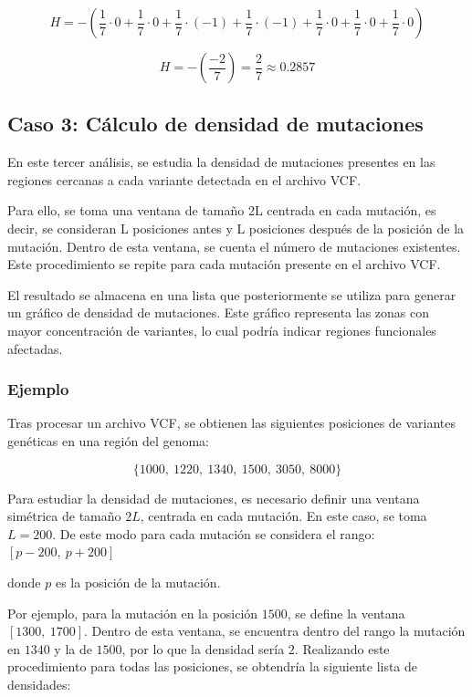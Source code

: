 \documentclass[11pt,spanish,listoffigures,listoftables]{tfgetsinf}
\begin{document}
\[
H = - \left(
\frac{1}{7} \cdot 0 +
\frac{1}{7} \cdot 0 +
\frac{1}{7} \cdot (-1) +
\frac{1}{7} \cdot (-1) +
\frac{1}{7} \cdot 0 +
\frac{1}{7} \cdot 0 +
\frac{1}{7} \cdot 0
\right)
\]

\[
H = - \left( \frac{-2}{7} \right) = \frac{2}{7} \approx 0.2857
\]


\subsection{Caso 3: Cálculo de densidad de mutaciones}

En este tercer análisis, se estudia la densidad de mutaciones presentes en las regiones cercanas a cada variante detectada en el archivo \acs{VCF}.

Para ello, se toma una ventana de tamaño 2L centrada en cada mutación, es decir, se consideran L posiciones antes y L posiciones después de la posición de la mutación. Dentro de esta ventana, se cuenta el número de mutaciones existentes. Este procedimiento se repite para cada mutación presente en el archivo \acs{VCF}.

El resultado se almacena en una lista que posteriormente se utiliza para generar un gráfico de densidad de mutaciones. Este gráfico representa las zonas con mayor concentración de variantes, lo cual podría indicar regiones funcionales afectadas.

\subsubsection{Ejemplo}

Tras procesar un archivo \acs{VCF}, se obtienen las siguientes posiciones de variantes genéticas en una región del genoma:

\[
\{1000,\ 1220,\ 1340,\ 1500,\ 3050,\ 8000\}
\]

Para estudiar la densidad de mutaciones, es necesario definir una ventana simétrica de tamaño $2L$, centrada en cada mutación. En este caso, se toma $L = 200$. De este modo para cada mutación se considera el rango: $[p - 200,\ p + 200]$

donde $p$ es la posición de la mutación.

Por ejemplo, para la mutación en la posición $1500$, se define la ventana $[1300,\ 1700]$. Dentro de esta ventana, se encuentra dentro del rango la mutación en $1340$ y la de $1500$, por lo que la densidad sería $2$. Realizando este procedimiento para todas las posiciones, se obtendría la siguiente lista de densidades:
\end{document}
